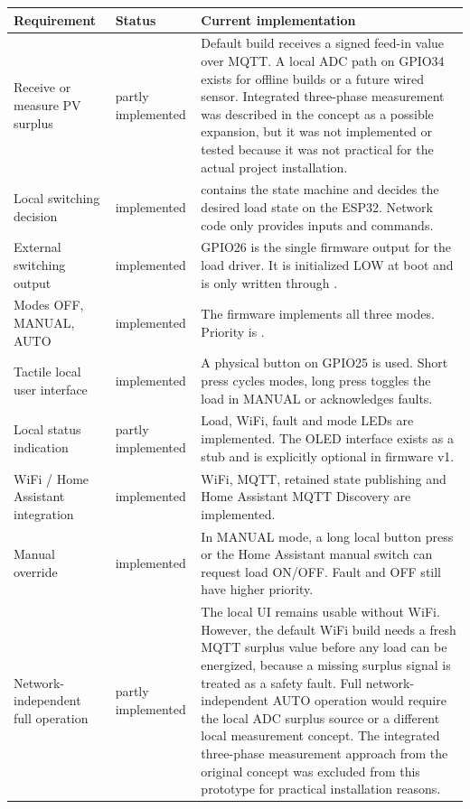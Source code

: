 \documentclass[12pt,a4paper]{article}
\newcommand{\code}[1]{\texttt{\detokenize{#1}}}
\newcommand{\statusdone}{implemented}
\newcommand{\statuspartial}{partly implemented}
\begin{document}
\begin{longtable}{p{}p{}p{}}
\toprule
Requirement & Status & Current implementation\\
\midrule
\endhead
Receive or measure PV surplus & \statuspartial &
Default build receives a signed feed-in value over MQTT. A local ADC path on
GPIO34 exists for offline builds or a future wired sensor. Integrated three-phase
measurement was described in the concept as a possible expansion, but it was not
implemented or tested because it was not practical for the actual project
installation.\\

Local switching decision & \statusdone &
\code{control.cpp} contains the state machine and decides the desired load state
on the ESP32. Network code only provides inputs and commands.\\

External switching output & \statusdone &
GPIO26 is the single firmware output for the load driver. It is initialized LOW
at boot and is only written through \code{hal::setLoad()}.\\

Modes OFF, MANUAL, AUTO & \statusdone &
The firmware implements all three modes. Priority is
\code{FAULT > OFF > MANUAL > AUTO}.\\

Tactile local user interface & \statusdone &
A physical button on GPIO25 is used. Short press cycles modes, long press toggles
the load in MANUAL or acknowledges faults.\\

Local status indication & \statuspartial &
Load, WiFi, fault and mode LEDs are implemented. The OLED interface exists as a
stub and is explicitly optional in firmware v1.\\

WiFi / Home Assistant integration & \statusdone &
WiFi, MQTT, retained state publishing and Home Assistant MQTT Discovery are
implemented.\\

Manual override & \statusdone &
In MANUAL mode, a long local button press or the Home Assistant manual switch can
request load ON/OFF. Fault and OFF still have higher priority.\\

Network-independent full operation & \statuspartial &
The local UI remains usable without WiFi. However, the default WiFi build needs a
fresh MQTT surplus value before any load can be energized, because a missing
surplus signal is treated as a safety fault. Full network-independent AUTO
operation would require the local ADC surplus source or a different local
measurement concept. The integrated three-phase measurement approach from the
original concept was excluded from this prototype for practical installation
reasons.\\


\end{longtable}
\end{document}
